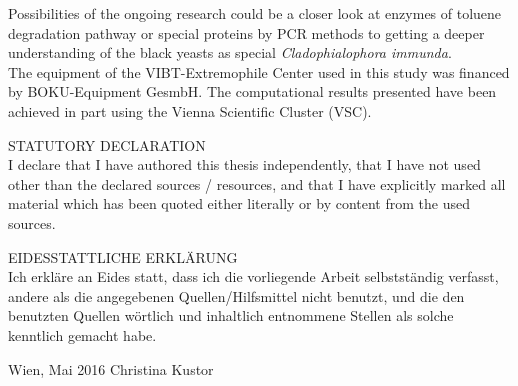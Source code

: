\documentclass[12pt, a4paper]{report}
\begin{document}
Possibilities of the ongoing research could be a closer look at enzymes of toluene degradation pathway or special proteins by PCR methods to getting a deeper understanding of the black yeasts as special \textit{Cladophialophora immunda}.\\
 

\newpage
The equipment of the VIBT-Extremophile Center used in this study was financed by BOKU-Equipment GesmbH. The computational results presented have been achieved in part using the Vienna Scientific Cluster (VSC). \\
\newpage
%
%

\newpage
\listoffigures
{}
\newpage
\listoftables
{}
\newpage
\vspace{2cm}

STATUTORY DECLARATION\\
I declare that I have authored this thesis independently, that I have not used
other than the declared sources / resources, and that I have explicitly marked
all material which has been quoted either literally or by content from the used
sources.\\
\vspace{1cm}

EIDESSTATTLICHE ERKLÄRUNG\\
Ich erkläre an Eides statt, dass ich die vorliegende Arbeit selbstständig verfasst,
andere als die angegebenen Quellen/Hilfsmittel nicht benutzt, und die
den benutzten Quellen wörtlich und inhaltlich entnommene Stellen als solche
kenntlich gemacht habe.\\
\vspace{3cm}


Wien, Mai 2016  \hspace*{6cm} Christina Kustor
\end{document}
